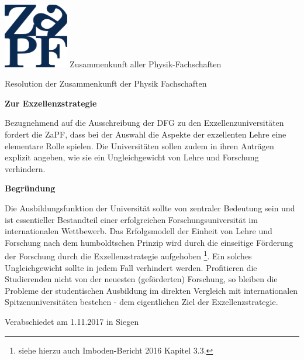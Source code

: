 \documentclass[DIV=calc]{scrartcl}
\begin{document}
    \hspace{0.87\textwidth}
    \begin{minipage}{120pt}
        \vspace{-1.8cm}
        \includegraphics[width=80pt]{../../logo.pdf}
        \centering
        \small Zusammenkunft aller Physik-Fachschaften
    \end{minipage}
    \begin{center}
        \huge{Resolution der Zusammenkunft der Physik Fachschaften}\vspace{.25\baselineskip}\\
        \normalsize
    \end{center}
    \vspace{1cm}    %

\textbf{Zur Exzellenzstrategie}

Bezugnehmend auf die Ausschreibung der DFG zu den Exzellenzuniversitäten fordert die ZaPF, dass bei der Auswahl die Aspekte der exzellenten Lehre eine elementare Rolle spielen.
Die Universitäten sollen zudem in ihren Anträgen explizit angeben, wie sie ein Ungleichgewicht von Lehre und Forschung verhindern. 

\textbf{Begründung}

Die Ausbildungsfunktion der Universität sollte von zentraler Bedeutung sein und ist essentieller Bestandteil einer erfolgreichen Forschungsuniversität im internationalen Wettbewerb. 
Das Erfolgsmodell der Einheit von Lehre und Forschung nach dem humboldtschen Prinzip wird durch die einseitige Förderung der Forschung durch die Exzellenzstrategie aufgehoben \footnote{siehe hierzu auch Imboden-Bericht 2016 Kapitel 3.3.}. Ein solches Ungleichgewicht sollte in jedem Fall verhindert werden. Profitieren die Studierenden nicht von der neuesten (geförderten) Forschung, so bleiben die Probleme der studentischen Ausbildung im direkten Vergleich mit internationalen Spitzenuniversitäten bestehen - dem eigentlichen Ziel der Exzellenzstrategie.
\vspace{-0.5\baselineskip}
    \begin{flushright}
        Verabschiedet am 1.11.2017 in Siegen
    \end{flushright}
\end{document}

